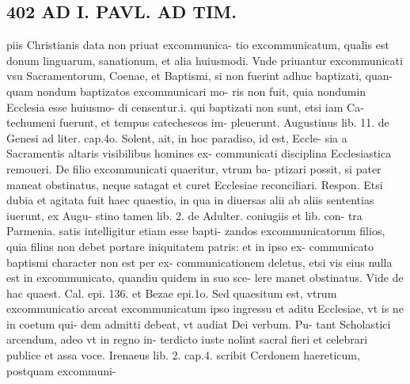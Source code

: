 \documentclass{article}
\begin{document}
\begin{pages}
\section*{402 AD I. PAVL. AD TIM. }\pstart piis Christianis data non priuat excommunica- tio excommunicatum, qualis est donum linguarum, sanationum, et alia huiusmodi. Vnde priuantur excommunicati vsu Sacramentorum, Coenae, et Baptismi, si non fuerint adhuc baptizati, quan- quam nondum baptizatos excommunicari mo- ris non fuit, quia nondumin Ecclesia esse huiusmo- di censentur.i. qui baptizati non sunt, etsi iam Ca- techumeni fuerunt, et tempus catecheseos im- pleuerunt. Augustinus lib.  11. de Genesi ad liter. cap.4o. Solent, ait, in hoc paradiso, id est, Eccle- sia a Sacramentis altaris visibilibus homines ex- communicati disciplina Ecclesiastica remoueri. De filio excommunicati quaeritur, vtrum ba- ptizari possit, si pater maneat obstinatus, neque satagat et curet Ecclesiae reconciliari. Respon. Etsi dubia et agitata fuit haec quaestio, in qua in diuersas alii ab aliis sententias iuerunt, ex Augu- stino tamen lib. 2. de Adulter. coniugiis et lib. con- tra Parmenia. satis intelligitur etiam esse bapti- zandos excommunicatorum filios, quia filius non debet portare iniquitatem patris: et in ipso ex- communicato baptismi character non est per ex- communicationem deletus, etsi vis eius nulla est in excommunicato, quandiu quidem in suo sce- lere manet obstinatus. Vide de hac quaest. Cal. epi. 136. et Bezae epi.1o. Sed quaesitum est, vtrum excommunicatio arceat excommunicatum ipso ingressu et aditu Ecclesiae, vt is ne in coetum qui- dem admitti debeat, vt audiat Dei verbum. Pu- tant Scholastici arcendum, adeo vt in regno in- terdicto iuste nolint sacral fieri et celebrari publice et assa voce. Irenaeus lib. 2. cap.4. scribit Cerdonem haereticum, postquam excommuni-  \pend

\end{pages}
\end{document}
